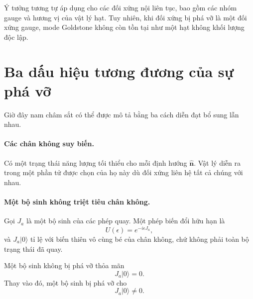 Ý tưởng tương tự áp dụng cho các đối xứng nội liên tục, bao gồm các nhóm gauge và hương vị của vật lý hạt. Tuy nhiên, khi đối xứng bị phá vỡ là một đối xứng gauge, mode Goldstone không còn tồn tại như một hạt không khối lượng độc lập.

\begin{classroomqa}
\end{classroomqa}

\section{Ba dấu hiệu tương đương của sự phá vỡ}

Giờ đây nam châm sắt có thể được mô tả bằng ba cách diễn đạt bổ sung lẫn nhau.

\paragraph{Các chân không suy biến.}
Có một trạng thái năng lượng tối thiểu cho mỗi định hướng \(\hat{\mathbf n}\). Vật lý diễn ra trong một phần tử được chọn của họ này dù đối xứng liên hệ tất cả chúng với nhau.

\paragraph{Một bộ sinh không triệt tiêu chân không.}
Gọi \(J_a\) là một bộ sinh của các phép quay. Một phép biến đổi hữu hạn là
\begin{equation}
U(\epsilon)=e^{-i\epsilon J_a},
\end{equation}
và \(J_a|0\rangle\) tỉ lệ với biến thiên vô cùng bé của chân không, chứ không phải toàn bộ trạng thái đã quay.

\begin{classroomqa}
\end{classroomqa}

Một bộ sinh không bị phá vỡ thỏa mãn
\begin{equation}
J_a|0\rangle=0.
\label{eq:l9-unbroken-generator}
\end{equation}
Thay vào đó, một bộ sinh bị phá vỡ cho
\begin{equation}
J_a|0\rangle\neq0.
\label{eq:l9-broken-generator}
\end{equation}

